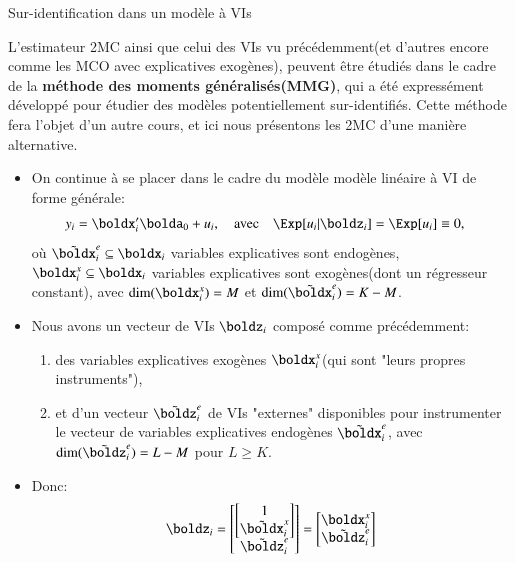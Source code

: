 \begin{frame}[allowframebreaks]{Sur-identification dans un modèle à VIs}
\begin{remark_fr}
L'estimateur 2MC ainsi que celui des VIs vu précédemment(et d'autres 
encore comme les MCO avec explicatives exogènes), peuvent être étudiés 
dans le cadre de la \textbf{méthode des moments généralisés(MMG)}, qui 
a été expressément développé pour étudier des modèles potentiellement sur-identifiés. 
Cette méthode fera l'objet d'un autre cours, et ici  nous présentons les 2MC d'une manière alternative.
\end{remark_fr}

\framebreak 

\begin{itemize}
    \item On continue à se placer dans le cadre du modèle modèle linéaire à VI de forme générale:
    \begin{align*}
        y_i&=\boldx_i^\prime \bolda_0+u_i, \quad \text{avec}\quad \Exp[u_i| \boldz_i]=\Exp[u_i]\equiv 0,
    \end{align*}
    où $\tilde{\boldx}_i^e\subseteq \boldx_i$ variables explicatives sont endogènes, 
    $\boldx_i^x\subseteq \boldx_i$ variables explicatives sont exogènes(dont un régresseur constant), avec $\dim(\boldx_i^x) = M$ 
    et $\dim(\tilde{\boldx}_i^e) = K-M$.
\item Nous avons un vecteur de VIs $\boldz_i$ composé comme précédemment:
\begin{enumerate}[$\star$] 
\item des variables explicatives exogènes $\boldx_i^x$(qui sont "leurs propres instruments"), 
\item et d'un vecteur $\tilde{\boldz}_i^e$ de VIs "externes"
disponibles pour instrumenter le vecteur de variables explicatives endogènes $\tilde{\boldx}_i^e$, 
avec $\dim(\tilde{\boldz}_i^e) = L-M$ pour $L \geq K$.
\end{enumerate}
\item Donc: 
\[
   \boldz_i = 
   \begin{bmatrix}
    \begin{bmatrix}
        1\\
        \tilde{\boldx}_i^x
    \end{bmatrix}\\ 
    \tilde{\boldz}_i^e
   \end{bmatrix}
   = 
   \begin{bmatrix}
    \boldx_i^x\\
    \tilde{\boldz}_i^e
   \end{bmatrix}
   \begin{array}{ll}

\end{array}\]
\end{itemize}
\end{frame}
